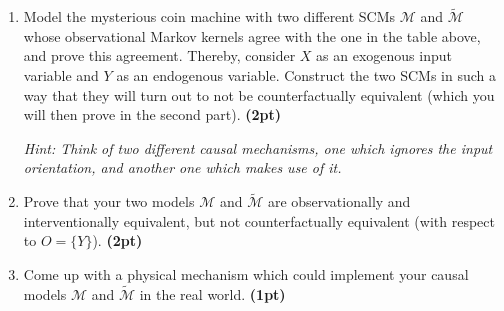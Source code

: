 \begin{enumerate}
  \item Model the mysterious coin machine with two different SCMs $\mathcal{M}$ and $\widetilde{\mathcal{M}}$ whose observational Markov kernels agree with the one in the table above, and prove this agreement. Thereby, consider $X$ as an exogenous input variable and $Y$ as an endogenous variable.
    Construct the two SCMs in such a way that they will turn out to not be counterfactually equivalent (which you will then prove in the second part).  \textbf{(2pt)}
   
    \emph{Hint: Think of two different causal mechanisms, one which ignores the input orientation, and another one which makes use of it.}
  \item Prove that your two models $\mathcal{M}$ and $\widetilde{\mathcal{M}}$ are observationally and interventionally equivalent, but not counterfactually equivalent (with respect to $O = \{Y\}$). \textbf{(2pt)}
  \item Come up with a physical mechanism which could implement your causal models $\mathcal{M}$ and $\widetilde{\mathcal{M}}$ in the real world.  \textbf{(1pt)} 
  \end{enumerate}	


